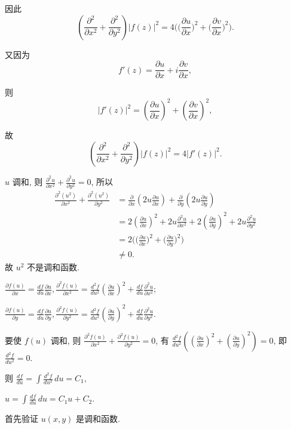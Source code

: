 \documentclass{homework}
\begin{document}
因此
\[\left(\frac{\partial^2}{\partial x^2}+\frac{\partial^2}{\partial y^2}\right)|f(z)|^2=4\bigg(\Big(\frac{\partial u}{\partial x}\Big)^2+\Big(\frac{\partial v}{\partial x}\Big)^2\bigg).\]

又因为
\[f'(z)=\frac{\partial u}{\partial x}+i\frac{\partial v}{\partial x},\]

则
\[|f'(z)|^2=\left(\frac{\partial u}{\partial x}\right)^2+\left(\frac{\partial v}{\partial x}\right)^2,\]

故
\[\left(\frac{\partial^2}{\partial x^2}+\frac{\partial^2}{\partial y^2}\right)|f(z)|^2=4|f'(z)|^2.\]

\(u\) 调和, 则 \(\frac{\partial^2 u}{\partial x^2}+\frac{\partial^2 u}{\partial y^2}=0\), 所以
\begin{align*}
  \frac{\partial^2(u^2)}{\partial x^2}+\frac{\partial^2(u^2)}{\partial y^2}&=\frac{\partial}{\partial x}\left(2u\frac{\partial u}{\partial x}\right)+\frac{\partial}{\partial y}\left(2u\frac{\partial u}{\partial y}\right)\\
  &=2\left(\frac{\partial u}{\partial x}\right)^2+2u\frac{\partial^2 u}{\partial x^2}+2\left(\frac{\partial u}{\partial y}\right)^2+2u\frac{\partial^2 u}{\partial y^2}\\
  &=2\bigg(\Big(\frac{\partial u}{\partial x}\Big)^2+\Big(\frac{\partial u}{\partial y}\Big)^2\bigg)\\
  &\neq0.
\end{align*}
故 \(u^2\) 不是调和函数.

\(\frac{\partial f(u)}{\partial x}=\frac{df}{du}\frac{\partial u}{\partial x}, \frac{\partial^2 f(u)}{\partial x^2}=\frac{d^2f}{du^2}(\frac{\partial u}{\partial x})^2+\frac{df}{du}\frac{\partial^2 u}{\partial x^2}\);

\(\frac{\partial f(u)}{\partial y}=\frac{df}{du}\frac{\partial u}{\partial y}, \frac{\partial^2 f(u)}{\partial y^2}=\frac{d^2f}{du^2}(\frac{\partial u}{\partial y})^2+\frac{df}{du}\frac{\partial^2 u}{\partial y^2}\).

要使 \(f(u)\) 调和, 则 \(\frac{\partial^2 f(u)}{\partial x^2}+\frac{\partial^2 f(u)}{\partial y^2}=0\), 有 \(\frac{d^2f}{du^2}((\frac{\partial u}{\partial x})^2+(\frac{\partial u}{\partial y})^2)=0\), 即 \(\frac{d^2f}{du^2}=0\).

则 \(\frac{df}{du}=\int\frac{d^2f}{du^2}\,du=C_1\),

\(u=\int\frac{df}{du}\,du=C_1u+C_2\).

首先验证 \(u(x, y)\) 是调和函数.
\end{document}
